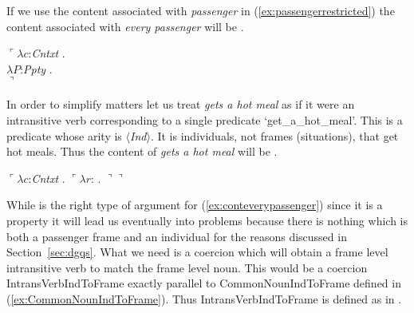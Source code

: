 If we use the content associated with
\textit{passenger} in (\ref{ex:passengerrestricted}) the
content associated with \textit{every passenger} will
be \nexteg{}.
\begin{ex}
$\ulcorner\lambda c$:\textit{Cntxt} . \\
  \hspace*{1em}$\lambda P$:\textit{Ppty} . \\
  \hspace*{2em}$\urcorner$  
\label{ex:conteverypassenger}
\end{ex} 
In order to simplify matters let us treat \textit{gets a hot meal} as
if it were an intransitive verb corresponding to a single predicate
`get\_a\_hot\_meal'.  This is a predicate whose arity is
$\langle$\textit{Ind}$\rangle$.  It is individuals, not frames
(situations), that get hot meals.  Thus the content of
\textit{gets a hot meal} will be \nexteg{}.
\begin{ex} 
$\ulcorner\lambda c$:\textit{Cntxt} . $\ulcorner\lambda r$: . 
                 $\urcorner\urcorner$ 
\label{ex:contgetahotmeal}
\end{ex} 
While \preveg{} is the right type of argument for
(\ref{ex:conteverypassenger}) since it is a property it will lead us
eventually into problems because there is nothing which is both a
passenger frame and an individual for the reasons discussed in
Section~\ref{sec:dgqs}.  What we need is a coercion which will obtain
a frame level intransitive verb to match the frame level noun.  This
would be a coercion IntransVerbIndToFrame exactly parallel to
CommonNounIndToFrame defined in (\ref{ex:CommonNounIndToFrame}).  Thus
IntransVerbIndToFrame is defined as in \nexteg{}.



